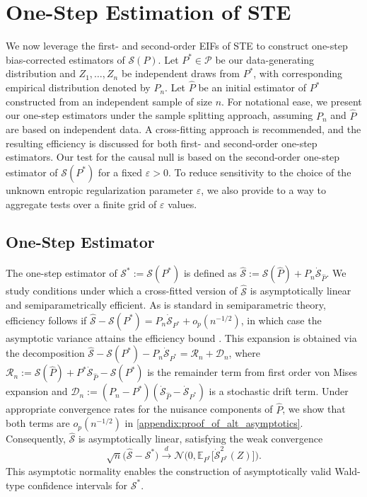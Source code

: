 \documentclass{article}
\theoremstyle{plain}
\theoremstyle{definition}
\theoremstyle{remark}
\newcommand{\E}{\mathbb{E}}
\newcommand{\cN}{\mathcal{N}}
\newcommand{\cR}{\mathcal{R}}
\newcommand{\cD}{\mathcal{D}}
\newcommand{\cP}{\mathcal{P}}
\newcommand{\wh}[1]{\widehat{#1}}
\newcommand{\hP}{\widehat{P}}
\newcommand{\1}{\mathbbm{1}}
\newcommand{\STE}{\mathscr{S}}
\newcommand{\eps}{\varepsilon}
\theoremstyle{plain}
\theoremstyle{definition}
\begin{document}
\section{One-Step Estimation of STE}\label{sec:one-step}
We now leverage the first- and second-order EIFs of STE to construct one-step bias-corrected estimators of $\STE(P)$. Let $P^* \in \cP$ be our data-generating distribution and $Z_1, \dots, Z_n$ be independent draws from $P^*$, with corresponding empirical distribution denoted by $P_n$. Let $\hP$ be an initial estimator of $P^*$ constructed from an independent sample of size $n$. For notational ease, we present our one-step estimators under the sample splitting approach, assuming $P_n$ and $\hP$ are based on independent data. A cross-fitting approach \cite{schick1986asymptotically, klaassen1987consistent, chernozhukov2018double} is recommended, and the resulting efficiency is discussed for both first- and second-order one-step estimators. Our test for the causal null is based on the second-order one-step estimator of $\STE(P^*)$ for a fixed $\eps>0$. To reduce sensitivity to the choice of the unknown entropic regularization parameter $\eps$, we also provide to a way to aggregate tests over a finite grid of $\eps$ values.

\subsection{One-Step Estimator}\label{sec:one-step-estimator}
The one-step estimator of $\STE^* := \STE(P^*)$ is defined as $\wh{\STE} := \STE(\hP) + P_n \dot{\STE}_{\hP}$. We study conditions under which a cross-fitted version of $\wh{\STE}$ is asymptotically linear and semiparametrically efficient. As is standard in semiparametric theory, efficiency follows if $\wh{\STE} - \STE(P^*) = P_n \dot{\STE}_{P^*} + o_p(n^{-1/2})$, in which case the asymptotic variance attains the efficiency bound \citep{bickel1993efficient, chernozhukov2018double}.
This expansion is obtained via the decomposition $\wh{\STE} - \STE(P^*) - P_n \dot{\STE}_{P^*} = \cR_n + \cD_n$, where $\cR_n := \STE(\hP) + P^* \dot{\STE}_{\hP} - \STE(P^*)$ is the remainder term from first order von Mises expansion and $\cD_n := (P_n - P^*) (\dot{\STE}_{\hP} - \dot{\STE}_{P^*})$ is a stochastic drift term. Under appropriate convergence rates for the nuisance components of $\hP$, we show that both terms are $o_p(n^{-1/2})$ in \cref{appendix:proof_of_alt_asymptotics}.
Consequently, $\wh{\STE}$ is asymptotically linear, satisfying the weak convergence 
\begin{equation}\label{eq:first_order_asymptotics}
    \sqrt{n}\big(\wh{\STE} - \STE^*\big) \xrightarrow[]{d} \cN\big(0, \E_{P^*}\big[\dot{\STE}_{P^*}^2(Z)\big]\big).
\end{equation}
This asymptotic normality enables the construction of asymptotically valid Wald-type confidence intervals for $\STE^*$.
\end{document}
